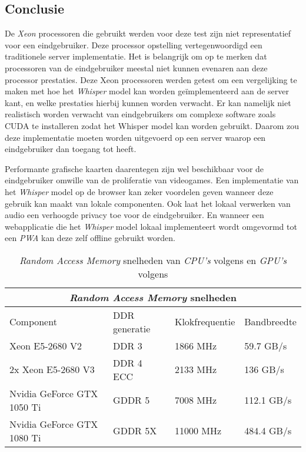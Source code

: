 \subsection{Conclusie}

De \textit{Xeon} processoren die gebruikt werden voor deze test zijn niet representatief voor een eindgebruiker. Deze processor opstelling vertegenwoordigd een traditionele server implementatie. Het is belangrijk om op te merken dat processoren van de eindgebruiker meestal niet kunnen evenaren aan deze processor prestaties. Deze Xeon processoren werden getest om een vergelijking te maken met hoe het \textit{Whisper} model kan worden geïmplementeerd aan de server kant, en welke prestaties hierbij kunnen worden verwacht. Er kan namelijk niet realistisch worden verwacht van eindgebruikers om complexe software zoals CUDA te installeren zodat het Whisper model kan worden gebruikt. Daarom zou deze implementatie moeten worden uitgevoerd op een server waarop een eindgebruiker dan toegang tot heeft.

\bigbreak{}

Performante grafische kaarten daarentegen zijn wel beschikbaar voor de eindgebruiker omwille van de proliferatie van videogames. Een implementatie van het \textit{Whisper} model op de browser kan zeker voordelen geven wanneer deze gebruik kan maakt van lokale componenten. Ook laat het lokaal verwerken van audio een verhoogde privacy toe voor de eindgebruiker. En wanneer een webapplicatie die het \textit{Whisper} model lokaal implementeert wordt omgevormd tot een \textit{PWA} kan deze zelf offline gebruikt worden.

\begin{table}[b]
    \begin{tabular}{ |p{6cm}|p{3cm}|p{3cm}|p{3cm}|  }
        \hline
        \multicolumn{4}{|c|}{\textit{Random Access Memory} snelheden} \\
        \hline
        Component& DDR generatie & Klokfrequentie & Bandbreedte \\
        \hline
            Xeon E5-2680 V2             & DDR 3     & 1866 MHz  & 59.7 GB/s \\
            2x Xeon E5-2680 V3          & DDR 4 ECC & 2133 MHz  & 136 GB/s  \\
            Nvidia GeForce GTX 1050 Ti  & GDDR 5    & 7008 MHz  & 112.1 GB/s\\
            Nvidia GeForce GTX 1080 Ti  & GDDR 5X   & 11000 MHz & 484.4 GB/s\\
        \hline
    \end{tabular}
    \caption[Verschillen in RAM snelheden voor \textit{CPU's} en \textit{GPU's}~\autocite{Intel2013,Intel2014,TechPowerUp2016, TechPowerUp2017}]{\textit{Random Access Memory} snelheden van \textit{CPU's} volgens \textcite{Intel2013,Intel2014} en \textit{GPU's} volgens \textcite{TechPowerUp2016, TechPowerUp2017}}
    \label{tab:RAMSpeeds}
\end{table}

